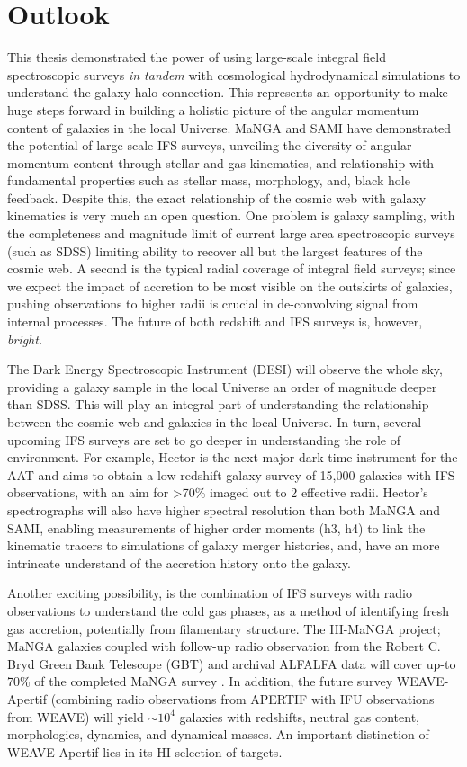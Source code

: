 \section{Outlook}
This thesis demonstrated the power of using large-scale integral field spectroscopic surveys \textit{in tandem} with cosmological hydrodynamical simulations to understand the galaxy-halo connection. This represents an opportunity to make huge steps forward in building a holistic picture of the angular momentum content of galaxies in the local Universe. MaNGA and SAMI have demonstrated the potential of large-scale IFS surveys, unveiling the diversity of angular momentum content through stellar and gas kinematics, and relationship with fundamental properties such as stellar mass, morphology, and, black hole feedback. Despite this, the exact relationship of the cosmic web with galaxy kinematics is very much an open question. One problem is galaxy sampling, with the completeness and magnitude limit of current large area spectroscopic surveys (such as SDSS) limiting ability to recover all but the largest features of the cosmic web. A second is the typical radial coverage of integral field surveys; since we expect the impact of accretion to be most visible on the outskirts of galaxies, pushing observations to higher radii is crucial in de-convolving signal from internal processes. The future of both redshift and IFS surveys is, however, \textit{bright}. 

The Dark Energy Spectroscopic Instrument (DESI) will observe the whole sky, providing a galaxy sample in the local Universe an order of magnitude deeper than SDSS. This will play an integral part of understanding the relationship between the cosmic web and galaxies in the local Universe. In turn, several upcoming IFS surveys are set to go deeper in understanding the role of environment. For example, Hector is the next major dark-time instrument for the AAT and aims to obtain a low-redshift galaxy survey of 15,000 galaxies with IFS observations, with an aim for >70\% imaged out to 2 effective radii. Hector's spectrographs will also have higher spectral resolution than both MaNGA and SAMI, enabling measurements of higher order moments (h3, h4) to link the kinematic tracers to simulations of galaxy merger histories, and, have an more intrincate understand of the accretion history onto the galaxy. 

Another exciting possibility, is the combination of IFS surveys with radio observations to understand the cold gas phases, as a method of identifying fresh gas accretion, potentially from filamentary structure. The HI-MaNGA project; MaNGA galaxies coupled with follow-up radio observation from the Robert C. Bryd Green Bank Telescope (GBT) and archival ALFALFA data will cover up-to 70\% of the completed MaNGA survey \citet{himanga}. In addition, the future survey WEAVE-Apertif (combining radio observations from APERTIF with IFU observations from WEAVE) will yield $\sim10^4$ galaxies with redshifts, neutral gas content, morphologies, dynamics, and dynamical masses. An important distinction of WEAVE-Apertif lies in its HI selection of targets. 

